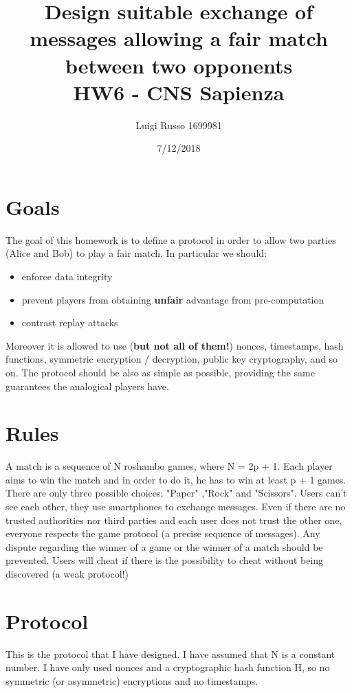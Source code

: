 \documentclass[11 pt]{article}
\title{
	Design suitable exchange of messages allowing a fair match between two opponents \\
	\large HW6 - CNS Sapienza}
\author{Luigi Russo 1699981}
\date{7/12/2018}
\begin{document}
\maketitle

\section{Goals}
The goal of this homework is to define a protocol in order to allow two parties (Alice and Bob) to play a fair match. In particular we should:
\begin{itemize}
	\item enforce data integrity
	\item prevent players from obtaining \textbf{unfair} advantage from pre-computation
	\item contrast replay attacks
\end{itemize}
Moreover it is allowed to use (\textbf{but not all of them!}) nonces, timestamps, hash functions, symmetric encryption / decryption, public key cryptography, and so on.
The protocol should be also as simple as possible, providing the same guarantees the analogical players have.

\section{Rules}
A match is a sequence of N roshambo games, where N = 2p + 1. Each player aims to win the match and in order to do it, he has to win at least p + 1 games. There are only three possible choices: "Paper" ,"Rock" and "Scissors". Users can't see each other, they use smartphones to exchange messages. Even if there are no trusted authorities nor third parties and each user does not trust the other one, everyone respects the game protocol (a precise sequence of messages). Any dispute regarding the winner of a game or the winner of a match should be prevented. Users will cheat if there is the possibility to cheat without being discovered (a weak protocol!)

\section{Protocol}
This is the protocol that I have designed. I have assumed that N is a constant number. I have only used nonces and a cryptographic hash function H, so no symmetric (or asymmetric) encryptions and no timestamps.
\end{document}
